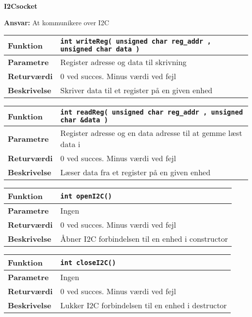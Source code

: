 {\centering
\textbf{I2Csocket}\par
}
\textbf{Ansvar:} At kommunikere over I2C \

\begin{center}
    \begin{tabular}{ | l | p{} |}
    \hline
    \textbf{Funktion}	& \verb+int writeReg( unsigned char reg_addr , unsigned char data ) +	\\ \hline
    \textbf{Parametre} 	& Register adresse og data til skrivning	\\ \hline
    \textbf{Returværdi}	& 0 ved succes. Minus værdi ved fejl \\ \hline
    \textbf{Beskrivelse}	& Skriver data til et register på en given enhed \\ \hline
    \end{tabular}
\end{center}

\begin{center}
    \begin{tabular}{ | l | p{} |}
    \hline
    \textbf{Funktion}	& \verb+int readReg( unsigned char reg_addr , unsigned char &data ) +\\ \hline
    \textbf{Parametre} 	& Register adresse og en data adresse til at gemme læst data i\\ \hline
    \textbf{Returværdi}	& 0 ved succes. Minus værdi ved fejl\\ \hline
    \textbf{Beskrivelse}	& Læser data fra et register på en given enhed\\ \hline
    \end{tabular}
\end{center}

\begin{center}
    \begin{tabular}{ | l | p{} |}
    \hline
    \textbf{Funktion}	& \verb+int openI2C() + \\ \hline
    \textbf{Parametre} 	& Ingen \\ \hline
    \textbf{Returværdi}	& 0 ved succes. Minus værdi ved fejl \\ \hline
    \textbf{Beskrivelse}	& Åbner I2C forbindelsen til en enhed i constructor \\ \hline
    \end{tabular}
\end{center}

\begin{center}
    \begin{tabular}{ | l | p{} |}
    \hline
    \textbf{Funktion}	& \verb+int closeI2C() +\\ \hline
    \textbf{Parametre} 	& Ingen \\ \hline
    \textbf{Returværdi}	& 0 ved succes. Minus værdi ved fejl \\ \hline
    \textbf{Beskrivelse}	& Lukker I2C forbindelsen til en enhed i destructor\\ \hline
    \end{tabular}
\end{center}

